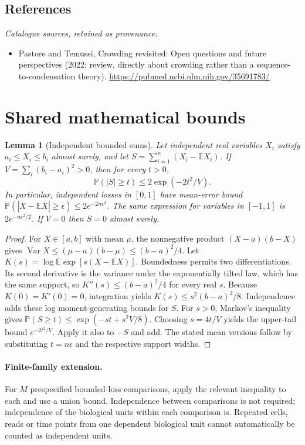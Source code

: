 \documentclass[11pt]{article}
\newcommand{\E}{\mathbb E}
\newcommand{\Prob}{\mathbb P}
\DeclareMathOperator{\Var}{Var}
\providecommand{\E}{\mathbb E}
\providecommand{\Prob}{\mathbb P}
\providecommand{\Var}{\operatorname{Var}}
\newtheorem{sharedlemma}{Lemma}[section]
\begin{document}
\subsection{References}
\noindent\emph{Catalogue sources, retained as provenance:}
\begin{itemize}
\item Pastore and Temussi, Crowding revisited: Open questions and future perspectives (2022; review, directly about crowding rather than a sequence-to-condensation theory). \url{https://pubmed.ncbi.nlm.nih.gov/35691783/}
\end{itemize}
\clearpage


\appendix
\section{Shared mathematical bounds}\label{app:bounds}
\begin{sharedlemma}[Independent bounded sums]\label{lem:bounded}
Let independent real variables $X_i$ satisfy $a_i\leq X_i\leq b_i$ almost surely,
and let $S=\sum_{i=1}^n(X_i-\E X_i)$. If
$V=\sum_i(b_i-a_i)^2>0$, then for every $t>0$,
\[
 \Prob(|S|\geq t)\leq 2\exp(-2t^2/V).
\]
In particular, independent losses in $[0,1]$ have mean-error bound
$\Prob(|\overline X-\E\overline X|\geq\epsilon)
\leq2e^{-2n\epsilon^2}$. The same expression for variables in $[-1,1]$
is $2e^{-n\epsilon^2/2}$. If $V=0$ then $S=0$ almost surely.
\end{sharedlemma}
\begin{proof}
For $X\in[a,b]$ with mean $\mu$, the nonnegative product
$(X-a)(b-X)$ gives
$\Var X\leq(\mu-a)(b-\mu)\leq(b-a)^2/4$.
Let $K(s)=\log\E\exp[s(X-\E X)]$.
Boundedness permits two differentiations. Its second derivative is the variance
under the exponentially tilted law, which has the same support, so
$K''(s)\leq(b-a)^2/4$ for every real $s$.
Because $K(0)=K'(0)=0$, integration yields
$K(s)\leq s^2(b-a)^2/8$.
Independence adds these log moment-generating bounds for $S$.
For $s>0$, Markov's inequality gives
$\Prob(S\geq t)\leq\exp(-st+s^2V/8)$.
Choosing $s=4t/V$ yields the upper-tail bound $e^{-2t^2/V}$.
Apply it also to $-S$ and add. The stated mean versions follow by substituting
$t=n\epsilon$ and the respective support widths.
\end{proof}

\paragraph{Finite-family extension.}
For $M$ prespecified bounded-loss comparisons, apply the relevant inequality to
each and use a union bound. Independence between comparisons is not required;
independence of the biological units within each comparison is. Repeated cells,
reads or time points from one dependent biological unit cannot automatically be
counted as independent units.
\end{document}
